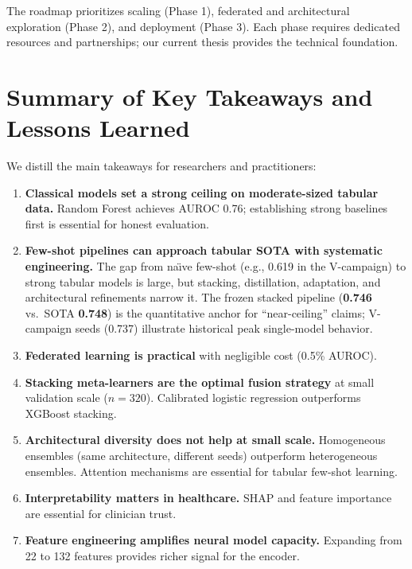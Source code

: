 The roadmap prioritizes scaling (Phase 1), federated and architectural exploration (Phase 2), and deployment (Phase 3). Each phase requires dedicated resources and partnerships; our current thesis provides the technical foundation.

\section{Summary of Key Takeaways and Lessons Learned}

We distill the main takeaways for researchers and practitioners:

\begin{enumerate}
\item \textbf{Classical models set a strong ceiling on moderate-sized tabular data.} Random Forest achieves AUROC 0.76; establishing strong baselines first is essential for honest evaluation.
\item \textbf{Few-shot pipelines can approach tabular SOTA with systematic engineering.} The gap from na\"{\i}ve few-shot (e.g., 0.619 in the V-campaign) to strong tabular models is large, but stacking, distillation, adaptation, and architectural refinements narrow it. The frozen stacked pipeline (\textbf{0.746} vs.\ SOTA \textbf{0.748}) is the quantitative anchor for ``near-ceiling'' claims; V-campaign seeds (0.737) illustrate historical peak single-model behavior.
\item \textbf{Federated learning is practical} with negligible cost (0.5\% AUROC).
\item \textbf{Stacking meta-learners are the optimal fusion strategy} at small validation scale ($n=320$). Calibrated logistic regression outperforms XGBoost stacking.
\item \textbf{Architectural diversity does not help at small scale.} Homogeneous ensembles (same architecture, different seeds) outperform heterogeneous ensembles. Attention mechanisms are essential for tabular few-shot learning.
\item \textbf{Interpretability matters in healthcare.} SHAP and feature importance are essential for clinician trust.
\item \textbf{Feature engineering amplifies neural model capacity.} Expanding from 22 to 132 features provides richer signal for the encoder.
\end{enumerate}

